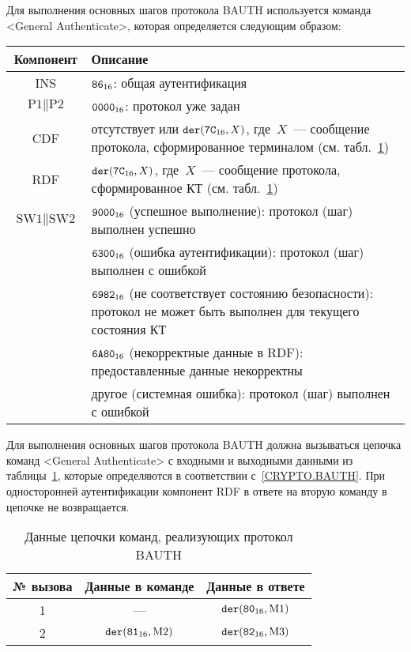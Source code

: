 Для выполнения основных шагов протокола BAUTH 
используется команда <General Authenticate>, 
которая определяется следующим образом:

\noindent
\begin{tabular}{|c|p{14cm}|}
\hline
Компонент & 	Описание \\
\hline
\hline
INS & $\texttt{86}_{16}$: общая аутентификация \\
\hline
$\text{P1} \parallel \text{P2}$ & $\texttt{0000}_{16}$: протокол уже задан\\ 
\hline
CDF & отсутствует или $\texttt{der}(\texttt{7C}_{16}, X)$, 
где~$X$~--- сообщение протокола, сформированное терминалом
(см. табл.~\ref{Table.Oper.BAUTH})\\
\hline \hline
RDF & $\texttt{der}(\texttt{7C}_{16}, X)$, где~$X$~--- 
сообщение протокола, сформированное КТ 
(см. табл.~\ref{Table.Oper.BAUTH})\\
\hline
$\text{SW1} \parallel \text{SW2}$ & $\texttt{9000}_{16}$ 
(успешное выполнение): протокол (шаг) выполнен успешно\\
 & $\texttt{6300}_{16}$ (ошибка аутентификации): протокол (шаг) выполнен с ошибкой \\
 & $\texttt{6982}_{16}$ (не соответствует состоянию безопасности): протокол не может 
быть выполнен для текущего состояния КТ\\
 & $\texttt{6A80}_{16}$ (некорректные данные в RDF): предоставленные данные некорректны\\
 & другое (системная ошибка): протокол (шаг) выполнен с ошибкой \\
\hline
\end{tabular}

Для выполнения основных шагов протокола BAUTH
должна вызываться цепочка команд <General 
Authenticate> с входными и выходными данными из таблицы~\ref{Table.Oper.BAUTH}, 
которые определяются в соответствии с~\ref{CRYPTO.BAUTH}. 
При односторонней аутентификации компонент RDF в ответе на вторую команду
в цепочке не возвращается.

\begin{table}[h]
\caption{Данные цепочки команд, реализующих протокол BAUTH}
\label{Table.Oper.BAUTH}
\begin{tabular}{|c|c|c|}
\hline
№ вызова & Данные в команде & Данные в ответе\\
\hline
\hline
1 & --- & $\texttt{der}(\texttt{80}_{16}, \text{M1})$\\
\hline
2 & $\texttt{der}(\texttt{81}_{16}, \text{M2})$ & 
$\texttt{der}(\texttt{82}_{16}, \text{M3})$  \\
\hline
\end{tabular}
\end{table}

